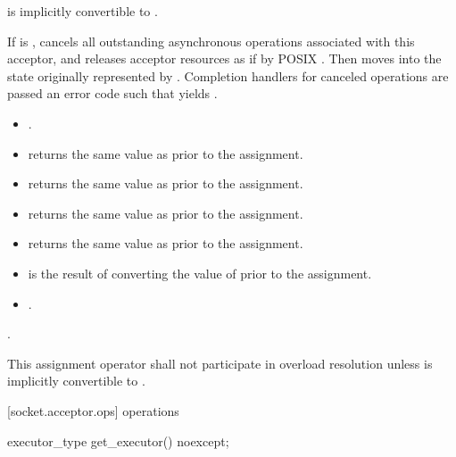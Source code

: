 \begin{itemdescr}
\pnum
\requires {} is implicitly convertible to .

\pnum
\effects If  is , cancels all outstanding asynchronous operations associated with this acceptor, and releases acceptor resources as if by POSIX . Then moves into  the state originally represented by . Completion handlers for canceled operations are passed an error code  such that  yields .

\pnum
\postconditions
\begin{itemize}
\item
{}.
\item
{} returns the same value as  prior to the assignment.
\item
{} returns the same value as  prior to the assignment.
\item
{} returns the same value as  prior to the assignment.
\item
{} returns the same value as  prior to the assignment.
\item
{} is the result of converting the value of  prior to the assignment.
\item
{}.
\end{itemize}

\pnum
\returns {}.

\pnum
\remarks This assignment operator shall not participate in overload resolution unless  is implicitly convertible to .
\end{itemdescr}



[socket.acceptor.ops]{ operations}

\begin{itemdecl}
executor_type get_executor() noexcept;
\end{itemdecl}

